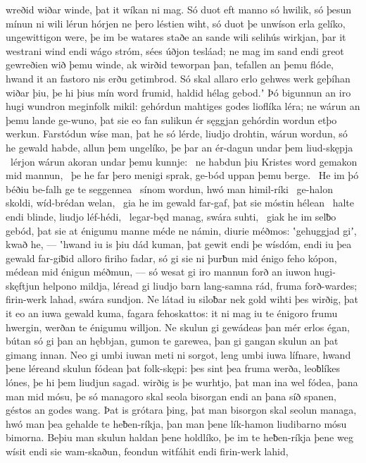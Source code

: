 wreðid wiðar winde, þat it wíkan ni mag.
Só duot eft manno só hwilik, só þesun mínun ni wili
lérun hórjen ne þero léstien wiht,
só duot þe unwíson erla gelíko,
ungewittigon were, þe im be watares staðe
an sande wili selihús wirkjan,
þar it westrani wind endi wágo stróm,
sées úðjon tesláad; ne mag im sand endi greot
gewreðien wið þemu winde, ak wirðid teworpan þan,
tefallen an þemu flóde, hwand it an fastoro nis
erðu getimbrod. Só skal allaro erlo gehwes
werk geþíhan wiðar þiu, þe hi þius mín word frumid,
haldid hélag gebod.ʼ Þó bigunnun an iro hugi wundron
meginfolk mikil: gehórdun mahtiges godes
lioflíka léra; ne wárun an þemu lande ge-wuno,
þat sie eo fan sulikun ér sęggjan gehórdin
wordun etþo werkun. Farstódun wíse man,
þat he só lérde, liudjo drohtin,
wárun wordun, só he gewald habde,
allun þem ungelíko, þe þar an ér-dagun
undar þem liud-skępja \hld\ lérjon wárun
akoran undar þemu kunnje: \hld\ ne habdun þiu Kristes word
gemakon mid mannun, \hld\ þe he far þero menigi sprak,
ge-bód uppan þemu berge. \hld\ He im þó béðiu be-falh
ge te seggennea \hld\ sínom wordun,
hwó man himil-ríki \hld\ ge-halon skoldi,
wíd-brédan welan, \hld\ gia he im gewald far-gaf,
þat sie móstin hélean \hld\ halte endi blinde,
liudjo léf-hédi, \hld\ legar-będ manag,
swára suhti, \hld\ giak he im selƀo gebód,
þat sie at énigumu manne méde ne námin,
diurie méðmos: ʽgehuggjad giʼ, kwað he, — ʽhwand iu is þiu dád kuman,
þat gewit endi þe wísdóm, endi iu þea gewald far-giƀid
alloro firiho fadar, só gi sie ni þurƀun mid énigo feho kópon,
médean mid énigun méðmun, — só wesat gi iro mannun forð
an iuwon hugi-skęftjun helpono mildja,
léread gi liudjo barn lang-samna rád,
fruma forð-wardes; firin-werk lahad,
swára sundjon. Ne látad iu siloƀar nek gold
wihti þes wirðig, þat it eo an iuwa gewald kuma,
fagara fehoskattos: it ni mag iu te énigoro frumu hwergin,
werðan te énigumu willjon. Ne skulun gi gewádeas þan mér
erlos égan, bútan só gi þan an hębbjan,
gumon te garewea, þan gi gangan skulun
an þat gimang innan. Neo gi umbi iuwan meti ni sorgot,
leng umbi iuwa lífnare, hwand þene léreand skulun
fódean þat folk-skępi: þes sint þea fruma werða,
leoƀlíkes lónes, þe hi þem liudjun sagad.
wirðig is þe wurhtjo, þat man ina wel fódea,
þana man mid mósu, þe só managoro skal
seola bisorgan endi an þana síð spanen,
géstos an godes wang. Þat is grótara þing,
þat man bisorgon skal seolun managa,
hwó man þea gehalde te heƀen-ríkja,
þan man þene lík-hamon liudibarno
mósu bimorna. Beþiu man skulun
haldan þene holdlíko, þe im te heƀen-ríkja
þene weg wísit endi sie wam-skaðun,
feondun witfáhit endi firin-werk lahid,
